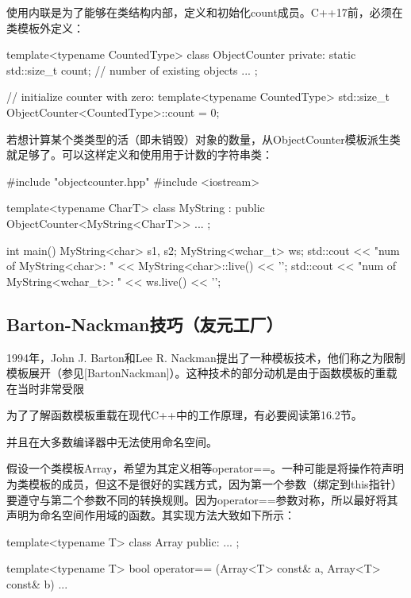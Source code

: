 使用内联是为了能够在类结构内部，定义和初始化count成员。C++17前，必须在类模板外定义：

\begin{cpp}
template<typename CountedType>
class ObjectCounter {
	private:
	static std::size_t count; // number of existing objects
	...
};

// initialize counter with zero:
template<typename CountedType>
std::size_t ObjectCounter<CountedType>::count = 0;
\end{cpp}

若想计算某个类类型的活（即未销毁）对象的数量，从ObjectCounter模板派生类就足够了。可以这样定义和使用用于计数的字符串类：

\begin{cpp}
#include "objectcounter.hpp"
#include <iostream>

template<typename CharT>
class MyString : public ObjectCounter<MyString<CharT>> {
	...
};

int main() {
	MyString<char> s1, s2;
	MyString<wchar_t> ws;
	std::cout << "num of MyString<char>: "
				<< MyString<char>::live() << '\n';
	std::cout << "num of MyString<wchar_t>: "
				<< ws.live() << '\n';
}
\end{cpp}

\subsection{Barton-Nackman技巧（友元工厂）}

1994年，John J. Barton和Lee R. Nackman提出了一种模板技术，他们称之为限制模板展开（参见[BartonNackman]）。这种技术的部分动机是由于函数模板的重载在当时非常受限

\begin{notice}
为了了解函数模板重载在现代C++中的工作原理，有必要阅读第16.2节。
\end{notice}

并且在大多数编译器中无法使用命名空间。

假设一个类模板Array，希望为其定义相等operator==。一种可能是将操作符声明为类模板的成员，但这不是很好的实践方式，因为第一个参数（绑定到this指针）要遵守与第二个参数不同的转换规则。因为operator==参数对称，所以最好将其声明为命名空间作用域的函数。其实现方法大致如下所示：

\begin{cpp}
template<typename T>
class Array {
	public:
	...
};

template<typename T>
bool operator== (Array<T> const& a, Array<T> const& b) {
	...
}
\end{cpp}

